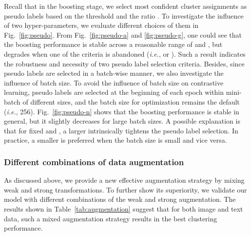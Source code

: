 Recall that in the boosting stage, we select most confident cluster assignments as pseudo labels based on the threshold  and the ratio . To investigate the influence of two hyper-parameters, we evaluate different choices of them in Fig.~\ref{fig:pseudo}. From Fig.~\ref{fig:pseudo-a} and \ref{fig:pseudo-g}, one could see that the boosting performance is stable across a reasonable range of  and , but degrades when one of the criteria is abandoned (\textit{i.e.},  or ). Such a result indicates the robustness and necessity of two pseudo label selection criteria. Besides, since pseudo labels are selected in a batch-wise manner, we also investigate the influence of batch size. To avoid the influence of batch size on contrastive learning, pseudo labels are selected at the beginning of each epoch within mini-batch of different sizes, and the batch size for optimization remains the default (\textit{i.e.}, 256). Fig.~\ref{fig:pseudo-n} shows that the boosting performance is stable in general, but it slightly decreases for large batch sizes. A possible explanation is that for fixed  and , a larger  intrinsically tightens the pseudo label selection. In practice, a smaller  is preferred when the batch size is small and vice versa.

\subsubsection{Different combinations of data augmentation}

As discussed above, we provide a new effective augmentation strategy by mixing weak and strong transformations. To further show its superiority, we validate our model with different combinations of the weak and strong augmentation. The results shown in Table~\ref{tab:augmentation} suggest that for both image and text data, such a mixed augmentation strategy results in the best clustering performance. 

